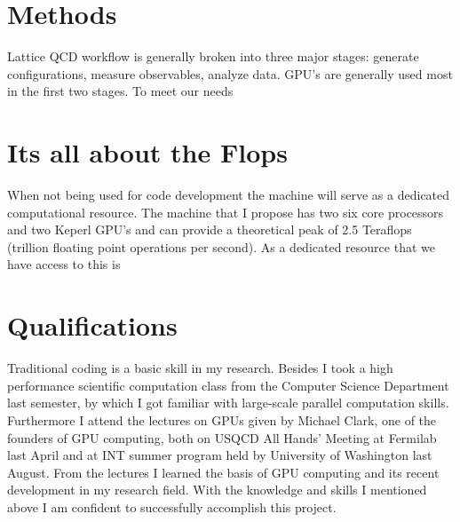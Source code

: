 \documentclass[11pt]{article}
\begin{document}
 

  \section*{Methods} %
  Lattice QCD workflow is generally broken into three major stages:  generate configurations, measure observables, analyze data.
  GPU's are generally used most in the first two stages.  
  To meet our needs

  
  \section*{Its all about the Flops} %
  When not being used for code development the machine will serve as a dedicated computational resource.  
  The machine that I propose has two six core processors and two Keperl GPU's and can provide a theoretical peak of 2.5 Teraflops (trillion floating point operations per second).  
  As a dedicated resource that we have access to this is 

  \section*{Qualifications} %
Traditional coding is a basic skill in my research. Besides I took a high performance scientific computation class from the Computer Science Department last 
semester, by which I got familiar with large-scale parallel computation skills. Furthermore I attend the lectures on GPUs given by Michael Clark, one of the founders of GPU computing, both on USQCD All Hands' Meeting at Fermilab last April and at INT summer program held by University of Washington last August. From the lectures I learned the basis of GPU computing and its recent development in my research field. With the knowledge and skills I mentioned above I am confident to successfully accomplish this project.
\end{document}
